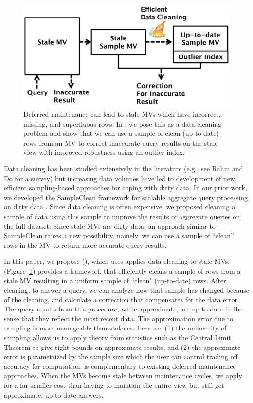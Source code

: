 \begin{figure}[t] \vspace{-2em}
\centering
 \includegraphics[scale=0.27]{figs/sys-arch.pdf} \vspace{-.25em}
 \caption{Deferred maintenance can lead to stale MVs which have incorrect, missing, and superfluous rows. In \svc, we pose this as a data cleaning problem and show that we can use a sample of clean (up-to-date) rows from an MV to correct inaccurate query results on the stale view with improved robustness using an outlier index. \label{sys-arch}}\vspace{-1.75em}
\end{figure}

Data cleaning has been studied extensively in the literature (e.g., see Rahm and Do for a survey\cite{rahm2000data}) but increasing data volumes have led to development of new, efficient sampling-based approaches for coping with dirty data.   
In our prior work, we developed the SampleClean framework for scalable aggregate query processing on dirty data \cite{wang1999sample}.
Since data cleaning is often expensive, we proposed cleaning a sample of data using this sample to improve the results of aggregate queries on the full dataset.
Since stale MVs are dirty data, an approach similar to SampleClean raises a new possibility, namely, we can use a sample of ``clean'' rows in the MV to return more accurate query results.

In this paper, we propose \svcfull (\svc), which uses applies data cleaning to stale MVs.
\svc (Figure~\ref{sys-arch}) provides a framework that efficiently cleans a sample of rows from a stale MV resulting in a uniform sample of ``clean" (up-to-date) rows.
After cleaning, to answer a query, we can analyze how that sample has changed because of the cleaning, and calculate a correction that compensates for the data error. 
The query results from this procedure, while approximate, are up-to-date in the sense that they reflect the most recent data. 
The approximation error due to sampling is more manageable than staleness because: (1) the uniformity of sampling allows us to apply theory from statistics such as the Central Limit Theorem to give tight bounds on approximate results, and (2) the approximate error is parametrized by the sample size which the user can control trading off accuracy for computation.
\svc is complementary to existing deferred maintenance approaches.
When the MVs become stale between maintenance cycles, we apply \svc for a far smaller cost than having to maintain the entire view but still get approximate, up-to-date answers.

